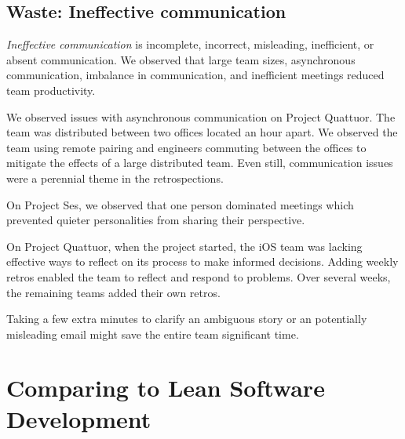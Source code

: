 \subsection{Waste: Ineffective communication}
\textit{Ineffective communication} is incomplete, incorrect, misleading, inefficient, or absent communication. We observed that large team sizes, asynchronous communication, imbalance in communication, and inefficient meetings reduced team productivity.

We observed issues with asynchronous communication on Project Quattuor. The team was distributed between two offices located an hour apart. We observed the team using remote pairing and engineers commuting between the offices to mitigate the effects of a large distributed team. Even still, communication issues were a perennial theme in the retrospections.

On Project Ses, we observed that one person dominated meetings which prevented quieter personalities from sharing their perspective. 

On Project Quattuor, when the project started, the iOS team was lacking effective ways to reflect on its process to make informed decisions. Adding weekly retros enabled the team to reflect and respond to problems. Over several weeks, the remaining teams added their own retros. 

Taking a few extra minutes to clarify an ambiguous story or an potentially misleading email might save the entire team significant time.








\section{Comparing to Lean Software Development}
\label{LeanSoftwareDevelopmentComparison}

